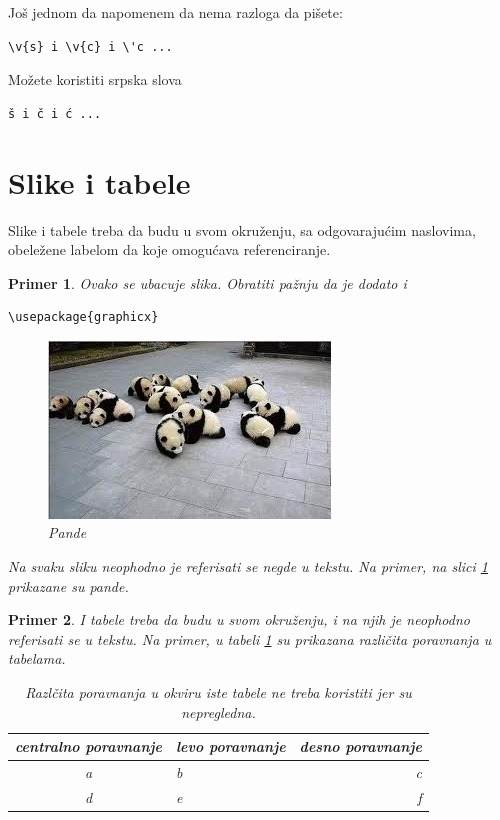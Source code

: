 \documentclass[a4paper]{article}
\newtheorem{primer}{Primer}[section]
\begin{document}
Još jednom da napomenem da nema razloga da pišete:
\begin{verbatim}
\v{s} i \v{c} i \'c ...
\end{verbatim}
Možete koristiti srpska slova
\begin{verbatim}
š i č i ć ... 
\end{verbatim}



\section{Slike i tabele}
\label{slike_i_tabele}

Slike i tabele treba da budu u svom okruženju, sa odgovarajućim naslovima, obeležene labelom da koje omogućava referenciranje. 

\begin{primer} Ovako se ubacuje slika. Obratiti pažnju da je dodato i 
\begin{verbatim}
\usepackage{graphicx}
\end{verbatim}

\begin{figure}[h!]
\begin{center}
\includegraphics[scale=0.75]{panda.jpg}
\end{center}
\caption{Pande}
\label{fig:pande}
\end{figure}

Na svaku sliku neophodno je referisati se negde u tekstu. Na primer, na slici \ref{fig:pande} prikazane su pande. 
\end{primer}

\begin{primer} I tabele treba da budu u svom okruženju, i na njih je neophodno referisati se u tekstu. Na primer, u tabeli \ref{tab:tabela1} su prikazana različita poravnanja u tabelama.

\begin{table}[h!]
\begin{center}
\caption{Razlčita poravnanja u okviru iste tabele ne treba koristiti jer su nepregledna.}
\begin{tabular}{|c|l|r|} \hline
centralno poravnanje& levo poravnanje& desno poravnanje\\ \hline
a &b&c\\ \hline
d &e&f\\ \hline
\end{tabular}
\label{tab:tabela1}
\end{center}
\end{table}

\end{primer}
\end{document}
